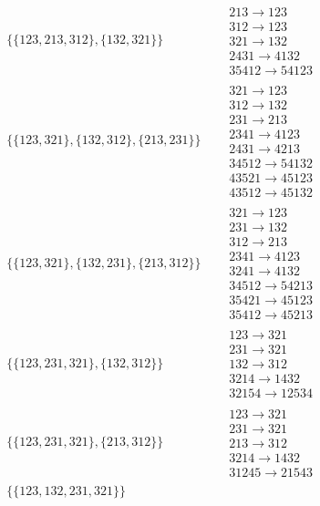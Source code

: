 \begin{tiny}
\begin{align}
\begin{matrix}
\end{matrix}
\\
\{\{123, 213, 312\}, \{132, 321\}\}
\quad
&
\begin{matrix}
213 \to 123\\312 \to 123\\321 \to 132\\2431 \to 4132\\35412 \to 54123
\end{matrix}
\\
\{\{123, 321\}, \{132, 312\}, \{213, 231\}\}
\quad
&
\begin{matrix}
321 \to 123\\312 \to 132\\231 \to 213\\2341 \to 4123\\2431 \to 4213\\34512 \to 54132\\43521 \to 45123\\43512 \to 45132
\end{matrix}
\\
\{\{123, 321\}, \{132, 231\}, \{213, 312\}\}
\quad
&
\begin{matrix}
321 \to 123\\231 \to 132\\312 \to 213\\2341 \to 4123\\3241 \to 4132\\34512 \to 54213\\35421 \to 45123\\35412 \to 45213
\end{matrix}
\\
\{\{123, 231, 321\}, \{132, 312\}\}
\quad
&
\begin{matrix}
123 \to 321\\231 \to 321\\132 \to 312\\3214 \to 1432\\32154 \to 12534
\end{matrix}
\\
\{\{123, 231, 321\}, \{213, 312\}\}
\quad
&
\begin{matrix}
123 \to 321\\231 \to 321\\213 \to 312\\3214 \to 1432\\31245 \to 21543
\end{matrix}
\\
\{\{123, 132, 231, 321\}\}

\end{align}
\end{tiny}
